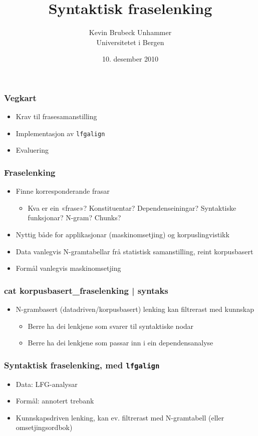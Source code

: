 \documentclass[bigger]{beamer}
\title{Syntaktisk fraselenking}
\author{Kevin Brubeck Unhammer\\ Universitetet i Bergen}
\date{10. desember 2010}
\begin{document}
\maketitle

\begin{frame}\frametitle{Vegkart}
  \begin{itemize}
  \item Krav til frasesamanstilling
  \item Implementasjon av \texttt{lfgalign}
  \item Evaluering
  \end{itemize}
\end{frame}

\begin{frame}\frametitle{Fraselenking}
    \begin{itemize}
    \item Finne korresponderande frasar
      \begin{itemize}
      \item Kva er ein «frase»? Konstituentar? Dependenseiningar?
        Syntaktiske funksjonar? N-gram? Chunks?
      \end{itemize}
    \item Nyttig både for applikasjonar (maskinomsetjing) og
      korpuslingvistikk
    \item Data vanlegvis N-gramtabellar frå statistisk samanstilling,
      reint korpusbasert
    \item Formål vanlegvis maskinomsetjing
    \end{itemize}
\end{frame}

\begin{frame}\frametitle{cat korpusbasert_fraselenking | syntaks}
    \begin{itemize}
    \item N-grambasert (datadriven/korpusbasert) lenking kan filtrerast med kunnskap
      \begin{itemize}
      \item Berre ha dei lenkjene som svarer til syntaktiske nodar \citep{samuelsson2007apa}
      \item Berre ha dei lenkjene som passar inn i ein dependensanalyse \citep{hearne2008ccd}
      \end{itemize}
    \end{itemize}
  \end{frame}

\begin{frame}\frametitle{Syntaktisk fraselenking, med \texttt{lfgalign}}
  \begin{itemize}
  \item Data: LFG-analysar
  \item Formål: annotert trebank
  \item Kunnskapsdriven lenking, kan ev. filtrerast med N-gramtabell (eller omsetjingsordbok)
  \end{itemize}
\end{frame}
\end{document}
